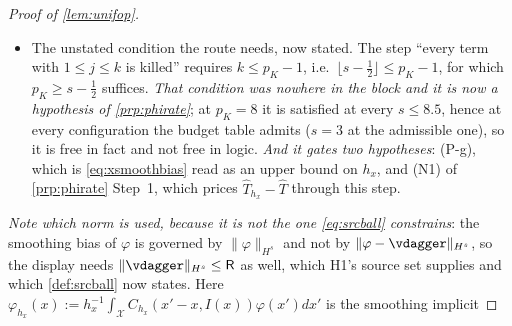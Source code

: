 \begin{proof}[Proof of \cref{lem:unifop}]
\begin{itemize}
Taking the supremum over $x$ and using $\|\varphi\|_{H^{s}}\le\mathsf R$ gives
\eqref{eq:xsmoothbias}.
\item[--] The unstated condition the route needs, now stated. The step ``every term with
$1\le j\le k$ is killed'' requires $k\le p_K-1$, i.e.\ $\lfloor s-\tfrac12\rfloor\le p_K-1$, for which
$p_K\ge s-\tfrac12$ suffices. \emph{That condition was nowhere in the block and it is now a hypothesis of
\cref{prp:phirate}}; at $p_K=8$ it is satisfied at every $s\le 8.5$, hence at every configuration the
budget table admits ($s=3$ at the admissible one), so it is free in fact and not free in logic.
\emph{And it gates two hypotheses}: (P-g), which is \eqref{eq:xsmoothbias} read as an upper bound on
$h_x$, and (N1) of \cref{prp:phirate} Step~1, which prices $\hat T_{h_x}-\hat T$ through this step.
\end{itemize}
\emph{Note which norm is used, because it is not the one \eqref{eq:srcball} constrains}: the smoothing
bias of $\varphi$ is governed by $\|\varphi\|_{H^{s}}$ and not by $\|\varphi-\vdagger\|_{H^{s}}$, so
the display needs $\|\vdagger\|_{H^{s}}\le\mathsf R$ as well, which H1's source set supplies and which
\cref{def:srcball} now states. Here
$\varphi_{h_x}(x):=h_x^{-1}\int_{\mathcal X}C_{h_x}(x'-x,I(x))\varphi(x')dx'$ is the smoothing implicit

\end{proof}
